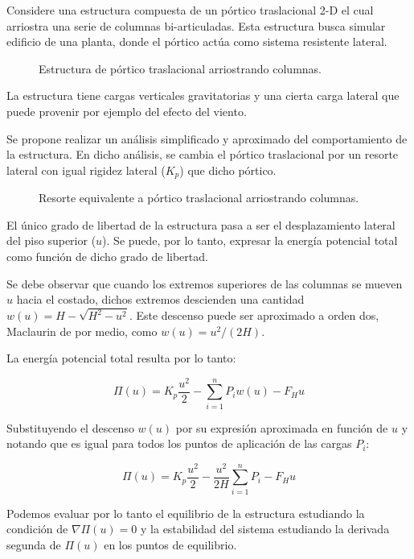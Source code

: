 Considere una estructura compuesta de un pórtico traslacional 2-D el cual arriostra una serie de columnas bi-articuladas. Esta estructura busca simular edificio de una planta, donde el pórtico actúa como sistema resistente lateral.

\begin{figure}[htb]
  \centering
  \def\svgwidth{0.8\textwidth}
  
	\caption{Estructura de pórtico traslacional arriostrando columnas.}
	\label{fig:globales}
\end{figure}

La estructura tiene cargas verticales gravitatorias y una cierta carga lateral que puede provenir por ejemplo del efecto del viento.

Se propone realizar un análisis simplificado y aproximado del comportamiento de la estructura. En dicho análisis, se cambia el pórtico traslacional por un resorte lateral con igual rigidez lateral ($K_{p}$) que dicho pórtico.

\begin{figure}[htb]
  \centering
  \def\svgwidth{0.6\textwidth}
  
	\caption{Resorte equivalente a pórtico traslacional arriostrando columnas.}
	\label{fig:globales2}
\end{figure}

El único grado de libertad de la estructura pasa a ser el desplazamiento lateral del piso superior ($u$). Se puede, por lo tanto, expresar la energía potencial total como función de dicho grado de libertad.

Se debe observar que cuando los extremos superiores de las columnas se mueven $u$ hacia el costado, dichos extremos descienden una cantidad $w(u)=H-\sqrt{H^2-u^2}$. Este descenso puede ser aproximado a orden dos, Maclaurin de por medio, como $w(u)=u^2/(2H)$.

La energía potencial total resulta por lo tanto:

$$\Pi(u)=K_p \frac{u^2}{2} -\sum_{i=1}^n P_i w(u) - F_H u$$

Substituyendo el descenso $w(u)$ por su expresión aproximada en función de $u$ y notando que es igual para todos los puntos de aplicación de las cargas $P_i$:

$$\Pi(u)=K_p \frac{u^2}{2} -\frac {u^2}{2H} \sum_{i=1}^n P_i - F_H u$$

Podemos evaluar por lo tanto el equilibrio de la estructura estudiando la condición de $\nabla \Pi(u)=0$ y la estabilidad del sistema estudiando la derivada segunda de $\Pi(u)$ en los puntos de equilibrio.

